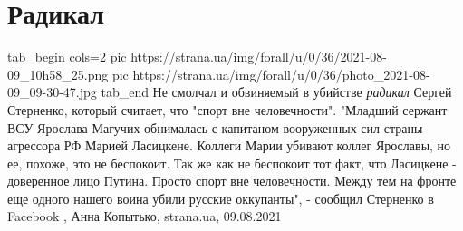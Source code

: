  
 
 
 
 
\chapter{Радикал}

\ifcmt
  tab_begin cols=2
     pic https://strana.ua/img/forall/u/0/36/2021-08-09_10h58_25.png
     pic https://strana.ua/img/forall/u/0/36/photo_2021-08-09_09-30-47.jpg
  tab_end
\fi
Не смолчал и обвиняемый в убийстве \emph{радикал} Сергей Стерненко, который считает,
что "спорт вне человечности".  "Младший сержант ВСУ Ярослава Магучих обнималась
с капитаном вооруженных сил страны-агрессора РФ Марией Ласицкене.  Коллеги
Марии убивают коллег Ярославы, но ее, похоже, это не беспокоит.  Так же как не
беспокоит тот факт, что Ласицкене - доверенное лицо Путина.  Просто спорт вне
человечности.  Между тем на фронте еще одного нашего воина убили русские
оккупанты", - сообщил Стерненко в Facebook
, 
Анна Копытько, strana.ua, 09.08.2021
